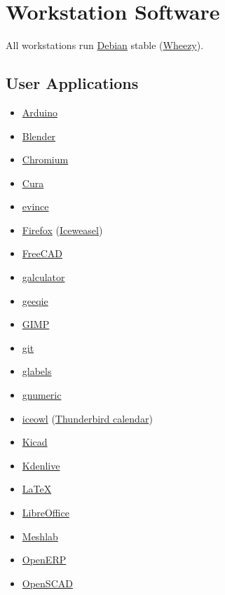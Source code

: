 \section{Workstation Software}

All workstations run \href{http://www.debian.org/}{Debian} stable (\href{https://www.debian.org/releases/wheezy/}{Wheezy}).

\subsection{User Applications}
\begin{itemize}
\item \href{http://www.arduino.cc/}{Arduino}
\item \href{http://www.blender.org/}{Blender}
\item \href{http://www.chromium.org/}{Chromium}
\item \href{https://lulzbot.com/cura}{Cura}
\item \href{http://www.gnome.org/projects/evince/}{evince}
\item \href{http://www.mozilla.org/en-US/firefox/}{Firefox} (\href{https://wiki.debian.org/Iceweasel}{Iceweasel})
\item \href{http://www.freecadweb.org/}{FreeCAD}
\item \href{http://galculator.sourceforge.net/}{galculator}
\item \href{http://geeqie.sourceforge.net/}{geeqie}
\item \href{http://www.gimp.org/}{GIMP}
\item \href{http://git-scm.com/}{git}
\item \href{http://glabels.sourceforge.net/}{glabels}
\item \href{http://www.gnumeric.org/}{gnumeric}
\item \href{https://packages.debian.org/wheezy/iceowl-extension}{iceowl} (\href{http://www.mozilla.org/en-US/thunderbird/}{Thunderbird calendar})
\item \href{http://iut-tice.ujf-grenoble.fr/kicad/}{Kicad}
\item \href{http://www.kdenlive.org/}{Kdenlive}
\item \href{http://www.latex-project.org/}{LaTeX}
\item \href{https://www.libreoffice.org/}{LibreOffice}
\item \href{http://meshlab.sourceforge.net/}{Meshlab}
\item \href{http://www.openerp.com/}{OpenERP}
\item \href{http://www.openscad.org/}{OpenSCAD}

\end{itemize}
